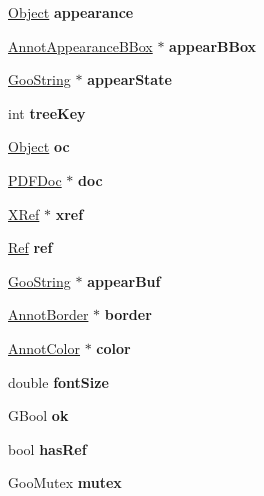 \begin{DoxyCompactItemize}
\hyperlink{class_object}{Object} {\bfseries appearance}
\item 
\mbox{\label{class_annot_a07adf44b81320f65cb17175f959cff17}} 
\hyperlink{class_annot_appearance_b_box}{Annot\+Appearance\+B\+Box} $\ast$ {\bfseries appear\+B\+Box}
\item 
\mbox{\label{class_annot_a71a3b5529bb3a031d635eb69d575382d}} 
\hyperlink{class_goo_string}{Goo\+String} $\ast$ {\bfseries appear\+State}
\item 
\mbox{\label{class_annot_a4f773a5792d74c14a859f16e2db95046}} 
int {\bfseries tree\+Key}
\item 
\mbox{\label{class_annot_a76312e212a018c71d4e62a123b48c0cf}} 
\hyperlink{class_object}{Object} {\bfseries oc}
\item 
\mbox{\label{class_annot_a3aee74ff9a1d30c24d849befd4af8215}} 
\hyperlink{class_p_d_f_doc}{P\+D\+F\+Doc} $\ast$ {\bfseries doc}
\item 
\mbox{\label{class_annot_afb17534c03f5e24128f9cfe564f8eeab}} 
\hyperlink{class_x_ref}{X\+Ref} $\ast$ {\bfseries xref}
\item 
\mbox{\label{class_annot_ab8cd292da6c3e309f33903efc7b62432}} 
\hyperlink{struct_ref}{Ref} {\bfseries ref}
\item 
\mbox{\label{class_annot_a0d09283887794bd49f31854e7965045d}} 
\hyperlink{class_goo_string}{Goo\+String} $\ast$ {\bfseries appear\+Buf}
\item 
\mbox{\label{class_annot_a9a74c1e1560df9a90e8c853997bdf056}} 
\hyperlink{class_annot_border}{Annot\+Border} $\ast$ {\bfseries border}
\item 
\mbox{\label{class_annot_a9de091953ea30ed9c445a2b038d0e32b}} 
\hyperlink{class_annot_color}{Annot\+Color} $\ast$ {\bfseries color}
\item 
\mbox{\label{class_annot_a3b5da63cc64143b21f4b32ecf8ea511b}} 
double {\bfseries font\+Size}
\item 
\mbox{\label{class_annot_a4d0502c949bff4b3fe0baea25e7cf4ad}} 
G\+Bool {\bfseries ok}
\item 
\mbox{\label{class_annot_a19be274e581df01ad28ab82ffbcb3eb6}} 
bool {\bfseries has\+Ref}
\item 
\mbox{\label{class_annot_a3bf26624d590e60ab071228c58c8f5b1}} 
Goo\+Mutex {\bfseries mutex}
\end{DoxyCompactItemize}
